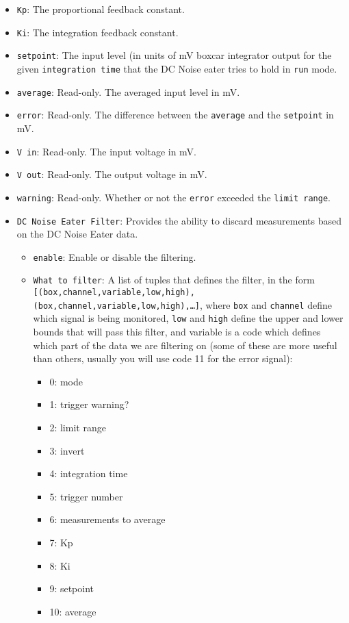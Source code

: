 \documentclass[pdftex,11pt,letterpaper]{article}
\begin{document}
\begin{itemize}
\item \texttt{Kp}:  The proportional feedback constant.
\item \texttt{Ki}:  The integration feedback constant.
\item \texttt{setpoint}:  The input level (in units of mV boxcar integrator output for the given \texttt{integration time} that the DC Noise eater tries to hold in \texttt{run} mode.
\item \texttt{average}:  Read-only.  The averaged input level in mV.
\item \texttt{error}:  Read-only.  The difference between the \texttt{average} and the \texttt{setpoint} in mV.
\item \texttt{V in}:  Read-only.  The input voltage in mV.
\item \texttt{V out}:  Read-only.  The output voltage in mV.
\item \texttt{warning}:  Read-only.  Whether or not the \texttt{error} exceeded the \texttt{limit range}.
\item \texttt{DC Noise Eater Filter}:  Provides the ability to discard measurements based on the DC Noise Eater data.
\begin{itemize}
\item \texttt{enable}:  Enable or disable the filtering.
\item \texttt{What to filter}:  A list of tuples that defines the filter, in the form \texttt{[(box,channel,variable,low,high),(box,channel,variable,low,high),\dots]}, where \texttt{box} and \texttt{channel} define which signal is being monitored, \texttt{low} and \texttt{high} define the upper and lower bounds that will pass this filter, and variable is a code which defines which part of the data we are filtering on (some of these are more useful than others, usually you will use code 11 for the error signal):
\begin{itemize}
\item 0: mode
\item 1: trigger warning?
\item 2: limit range
\item 3: invert
\item 4: integration time
\item 5: trigger number
\item 6: measurements to average
\item 7: Kp
\item 8: Ki
\item 9: setpoint
\item 10: average

\end{itemize}
\end{itemize}
\end{itemize}
\end{document}
